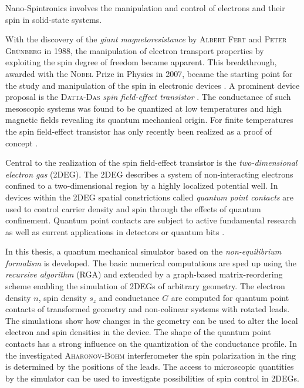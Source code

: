 Nano-Spintronics involves the manipulation and control of electrons and their spin in solid-state systems.\par
With the discovery of the \emph{giant magnetoresistance} by \textsc{Albert Fert} and \textsc{Peter Gr\"unberg} in 1988, the manipulation of electron transport properties by exploiting the spin degree of freedom became apparent. This breakthrough, awarded with the \textsc{Nobel} Prize in Physics in 2007, became the starting point for the study and manipulation of the spin in electronic devices \cite{evegeny2010spin}. A prominent device proposal is the \textsc{Datta-Das} \emph{spin field-effect transistor} \cite{datta:665}. The conductance of such mesoscopic systems was found to be quantized \cite{PhysRevLett.45.494} at low temperatures and high magnetic fields revealing its quantum mechanical origin. For finite temperatures the spin field-effect transistor has only recently been realized as a proof of concept \cite{Wunderlich24122010}.\par
Central to the realization of the spin field-effect transistor is the \emph{two-dimensional electron gas} (2DEG). The 2DEG describes a system of non-interacting electrons confined to a two-dimensional region by a highly localized potential well. In devices within the 2DEG spatial constrictions called \emph{quantum point contacts} are used to control carrier density and spin through the effects of quantum confinement. Quantum point contacts are subject to active fundamental research as well as current applications in detectors \cite{PhysRevB.67.161308} or quantum bits \cite{PhysRevA.57.120}.\par
In this thesis, a quantum mechanical simulator based on the \emph{non-equilibrium \gfnc{} formalism} is developed. The basic numerical computations are sped up using the \emph{recursive \gfnc{} algorithm} (RGA) and extended by a graph-based matrix-reordering scheme enabling the simulation of 2DEGs of arbitrary geometry.
The electron density $n$, spin density $s_z$ and conductance $G$ are computed for quantum point contacts of transformed geometry and non-colinear systems with rotated leads. The simulations show how changes in the geometry can be used to alter the local electron and spin densities in the device.
The shape of the quantum point contacts has a strong influence on the quantization of the conductance profile. In the investigated \textsc{Aharonov-Bohm} interferometer the spin polarization in the ring is determined by the positions of the leads. The access to microscopic quantities by the simulator can be used to investigate possibilities of spin control in 2DEGs.
